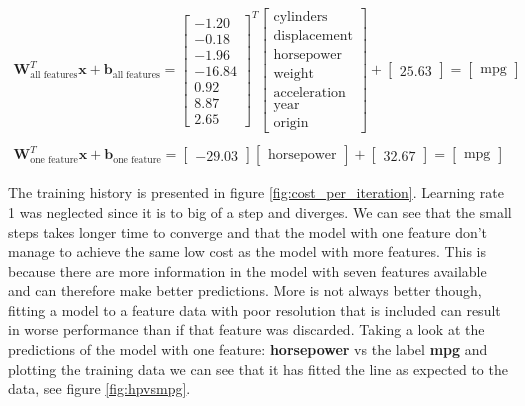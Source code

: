 \documentclass[a4paper,10pt]{article}
\begin{document}
\begin{equation}
\begin{aligned}
    \textbf{W}_{\text{all features}}^{T}\textbf{x} + \textbf{b}_{\text{all features}} = \begin{bmatrix} -1.20 \\ -0.18 \\ -1.96 \\ -16.84 \\ 0.92 \\ 8.87 \\2.65 \end{bmatrix}^{T}\begin{bmatrix} \text{cylinders}\\\text{displacement}\\ \text{horsepower}\\ \text{weight} \\  \text{acceleration} \\ \text{year} \\ \text{origin} \end{bmatrix} + \begin{bmatrix} 25.63 \end{bmatrix} = \begin{bmatrix} \text{mpg} \end{bmatrix} \\
   \\
    \textbf{W}_{\text{one feature}}^{T}\textbf{x} +\textbf{b}_{\text{one feature}} = \begin{bmatrix} -29.03 \end{bmatrix} \begin{bmatrix} \text{horsepower} \end{bmatrix} +\begin{bmatrix} 32.67 \end{bmatrix}  = \begin{bmatrix} \text{mpg} \end{bmatrix}
\label{eq:model}
\end{aligned}
\end{equation}

The training history is presented in figure \ref{fig:cost_per_iteration}. Learning rate 1 was neglected since it is to big of a step and diverges. We can see that the small steps takes longer time to converge and that the model with one feature don't manage to achieve the same low cost as the model with more features. This is because there are more information in the model with seven features available and can therefore make better predictions. More is not always better though, fitting a model to a feature data with poor resolution that is included can result in worse performance than if that feature was discarded. Taking a look at the predictions of the model with one feature: \textbf{horsepower} vs the label \textbf{mpg} and plotting the training data we can see that it has fitted the line as expected to the data, see figure \ref{fig:hpvsmpg}. 
\end{document}
